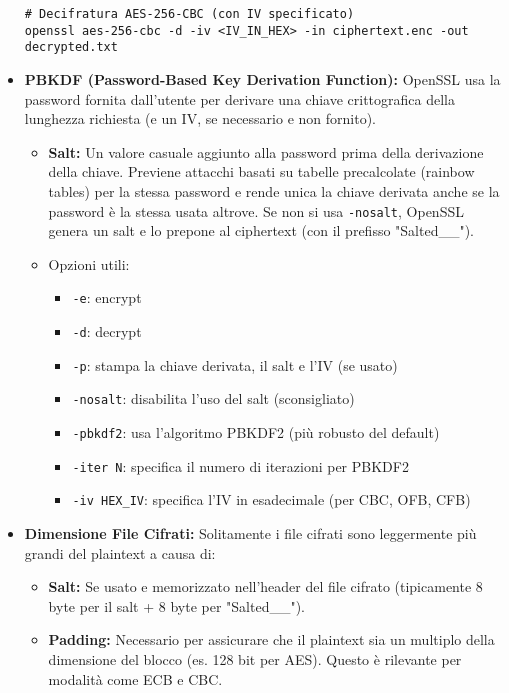 \begin{itemize}
\begin{verbatim}
# Decifratura AES-256-CBC (con IV specificato)
openssl aes-256-cbc -d -iv <IV_IN_HEX> -in ciphertext.enc -out decrypted.txt
    \end{verbatim}
    \item \textbf{PBKDF (Password-Based Key Derivation Function):}
    OpenSSL usa la password fornita dall'utente per derivare una chiave crittografica della lunghezza richiesta (e un IV, se necessario e non fornito).
    \begin{itemize}
        \item \textbf{Salt:} Un valore casuale aggiunto alla password prima della derivazione della chiave. Previene attacchi basati su tabelle precalcolate (rainbow tables) per la stessa password e rende unica la chiave derivata anche se la password è la stessa usata altrove. Se non si usa \texttt{-nosalt}, OpenSSL genera un salt e lo prepone al ciphertext (con il prefisso "Salted\_\_").
        \item Opzioni utili:
        \begin{itemize}
            \item \texttt{-e}: encrypt
            \item \texttt{-d}: decrypt
            \item \texttt{-p}: stampa la chiave derivata, il salt e l'IV (se usato)
            \item \texttt{-nosalt}: disabilita l'uso del salt (sconsigliato)
            \item \texttt{-pbkdf2}: usa l'algoritmo PBKDF2 (più robusto del default)
            \item \texttt{-iter N}: specifica il numero di iterazioni per PBKDF2
            \item \texttt{-iv HEX\_IV}: specifica l'IV in esadecimale (per CBC, OFB, CFB)
        \end{itemize}
    \end{itemize}
    \item \textbf{Dimensione File Cifrati:}
    Solitamente i file cifrati sono leggermente più grandi del plaintext a causa di:
    \begin{itemize}
        \item \textbf{Salt:} Se usato e memorizzato nell'header del file cifrato (tipicamente 8 byte per il salt + 8 byte per "Salted\_\_").
        \item \textbf{Padding:} Necessario per assicurare che il plaintext sia un multiplo della dimensione del blocco (es. 128 bit per AES). Questo è rilevante per modalità come ECB e CBC.
    \end{itemize}
\end{itemize}

